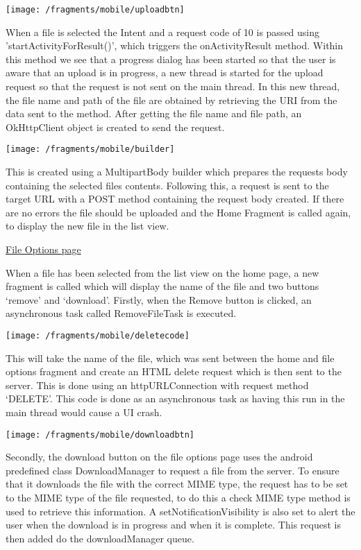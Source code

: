 \documentclass{article}
\begin{document}
\texttt{[image: /fragments/mobile/uploadbtn]}

When a file is selected the Intent and a request code of 10 is passed using 'startActivityForResult()', which triggers the onActivityResult method. Within this method we see that a progress dialog has been started so that the user is aware that an upload is in progress, a new thread is started for the upload request so that the request is not sent on the main thread. In this new thread, the file name and path of the file are obtained by retrieving the URI from the data sent to the method. After getting the file name and file path, an OkHttpClient object is created to send the request. 

\texttt{[image: /fragments/mobile/builder]}

This is created using a MultipartBody builder which prepares the requests body containing the selected files contents. Following this, a request is sent to the target URL with a POST method containing the request body created. If there are no errors the file should be uploaded and the Home Fragment is called again, to display the new file in the list view. 

\underline{File Options page}

When a file has been selected from the list view on the home page, a new fragment is called which will display the name of the file and two buttons ‘remove’ and ‘download’. Firstly, when the Remove button is clicked, an asynchronous task called RemoveFileTask is executed. 

\texttt{[image: /fragments/mobile/deletecode]}

This will take the name of the file, which was sent between the home and file options fragment and create an HTML delete request which is then sent to the server. This is done using an httpURLConnection with request method ‘DELETE’. This code is done as an asynchronous task as having this run in the main thread would cause a UI crash. 

\texttt{[image: /fragments/mobile/downloadbtn]}

Secondly, the download button on the file options page uses the android predefined class DownloadManager to request a file from the server. To ensure that it downloads the file with the correct MIME type, the request has to be set to the MIME type of the file requested, to do this a check MIME type method is used to retrieve this information. A setNotificationVisibility is also set to alert the user when the download is in progress and when it is complete. This request is then added do the downloadManager queue. 
\end{document}
